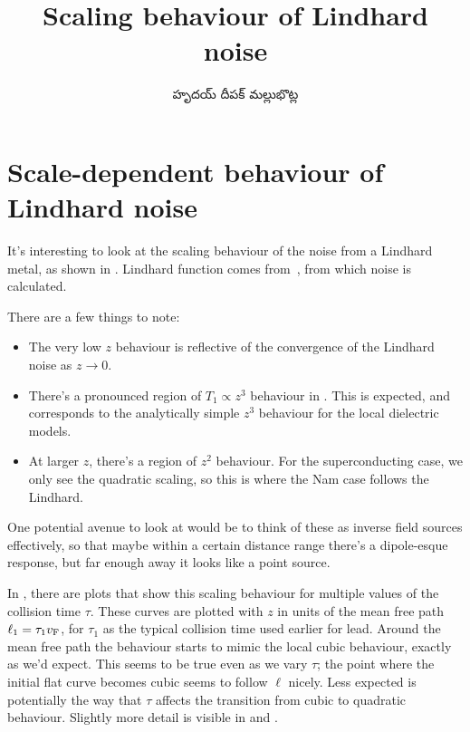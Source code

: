 \documentclass[../main.tex]{subfiles}
\title{Scaling behaviour of Lindhard noise}
\author{\begin{telugu}హృదయ్ దీపక్ మల్లుభొట్ల\end{telugu}}
\date{}
\begin{document}
	\graphicspath{{\main/figures/}}

	\onlyinsubfile{\maketitle}

	\section{Scale-dependent behaviour of Lindhard noise} \label{sec:lsb:intro}

	It's interesting to look at the scaling behaviour of the noise from a Lindhard metal, as shown in .
	Lindhard function comes from~\cite{SolyomV3}, from which noise is calculated.

	There are a few things to note:
	\begin{itemize}
		\item The very low $z$ behaviour is reflective of the convergence of the Lindhard noise as $z \rightarrow 0$.
		\item There's a pronounced region of $T_1 \propto z^3$ behaviour in .
			This is expected, and corresponds to the analytically simple $z^3$ behaviour for the local dielectric models.
		\item At larger $z$, there's a region of $z^2$ behaviour.
			For the superconducting case, we only see the quadratic scaling, so this is where the Nam case follows the Lindhard.
	\end{itemize}

	One potential avenue to look at would be to think of these as inverse field sources effectively, so that maybe within a certain distance range there's a dipole-esque response, but far enough away it looks like a point source.

	In , there are plots that show this scaling behaviour for multiple values of the collision time $\tau$.
	These curves are plotted with $z$ in units of the mean free path $\ell_1 = \tau_1 v_{\mathrm{F}}$, for $\tau_1$ as the typical collision time used earlier for lead.
	Around the mean free path the behaviour starts to mimic the local cubic behaviour, exactly as we'd expect.
	This seems to be true even as we vary $\tau$;
	the point where the initial flat curve becomes cubic seems to follow $\ell$ nicely.
	Less expected is potentially the way that $\tau$ affects the transition from cubic to quadratic behaviour. 
	Slightly more detail is visible in  and .
\end{document}
